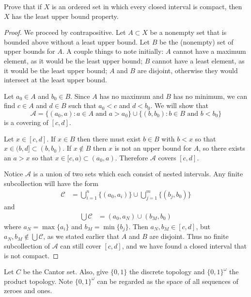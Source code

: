 \documentclass[11pt]{article}
\begin{document}
\begin{ex}{27.1}
  Prove that if $X$ is an ordered set in which every closed interval is compact,
  then $X$ has the least upper bound property.
\end{ex}

\begin{proof}
  We proceed by contrapositive. Let $A \subset X$ be a nonempty set that is
  bounded above without a least upper bound. Let $B$ be the (nonempty) set of
  upper bounds for $A$. A couple things to
  note initially: $A$ cannot have a maximum element, as it would be the least
  upper bound; $B$ cannot have a least element, as it would be the least upper
  bound; $A$ and $B$ are disjoint, otherwise they would intersect at the
  least upper bound.

  Let $a_0 \in A$ and $b_0 \in B$. Since $A$ has no maximum and $B$ has no
  minimum, we can find $c \in A$ and $d \in B$ such that $a_0 < c$ and
  $d < b_0$. We will show that
  \[ \mathcal{A}
        = \{(a_0, a): a \in A \text{ and } a > a_0\}
          \cup \{(b, b_0): b \in B \text{ and } b < b_0\}
        \]
  is a covering of $[c, d]$.

  Let $x \in [c, d]$. If $x \in B$ then there must exist $b \in B$ with $b < x$ so
  that $x \in (b, d] \subset (b, b_0).$ If $x \not\in B$ then $x$ is not
  an upper bound for $A$, so there exists an $a > x$ so that $x \in [c, a)
  \subset (a_0, a).$ Therefore $\mathcal{A}$ covers $[c, d]$.

  Notice $\mathcal{A}$ is a union of two sets which each consist of nested intervals.
  Any finite subcollection will have the form
  \begin{align*}
    \mathcal{C} &= \bigcup_{i=1}^n \{(a_0, a_i)\} \cup \bigcup_{j=1}^m \{(b_j,
    b_0)\}
  \end{align*}
  and
  \begin{align*}
    \bigcup \mathcal{C} &= (a_0, a_N) \cup (b_M, b_0)
  \end{align*}
  where $a_N = \max\{a_i\}$ and $b_M = \min\{b_j\}$. Then $a_N, b_M \in [c, d]$,
  but $a_N, b_M \not\in \bigcup \mathcal{C}$, as we stated
  earlier that $A$ and $B$ are disjoint. Thus no finite subcollection of
  $\mathcal{A}$ can still cover $[c, d]$, and we have found a closed interval
  that is not compact.
\end{proof}


Let $C$ be the Cantor set. %
Also, give $\{0, 1\}$ the discrete topology and $\{0, 1\}^\omega$ the product
topology. Note $\{0, 1\}^\omega$ can be regarded as the space of all sequences
of zeroes and ones.
\end{document}
